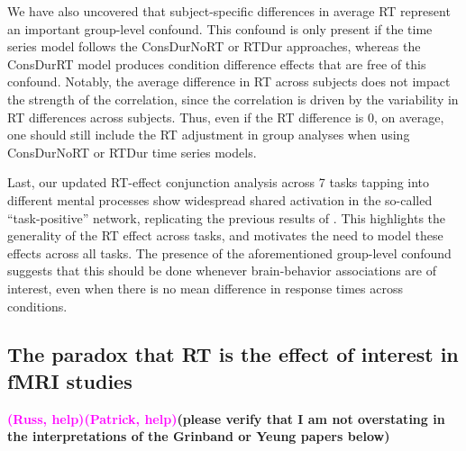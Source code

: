\documentclass[titlepage,12pt] {article}
\newcommand{\rh}{\textcolor{magenta}{\textbf{(Russ, help)}}}
\newcommand{\ph}{\textcolor{magenta}{\textbf{(Patrick, help)}}}
\begin{document}
We have also uncovered that subject-specific differences in average RT represent an important group-level confound.  This confound is only present if the time series model follows the ConsDurNoRT or RTDur approaches, whereas the ConsDurRT model produces condition difference effects that are free of this confound.  Notably, the average difference in RT across subjects does not impact the strength of the correlation, since the correlation is driven by the variability in RT differences across subjects.  Thus, even if the RT difference is 0, on average, one should still include the RT adjustment in group analyses when using ConsDurNoRT or RTDur time series models.


Last, our updated RT-effect conjunction analysis across 7 tasks tapping into different mental processes show widespread shared activation in the so-called ``task-positive'' network, replicating the previous results of \citet{yarkoni_bold_2009}. This highlights the generality of the RT effect across tasks, and motivates the need to model these effects across all tasks.  The presence of the aforementioned group-level confound suggests that this should be done whenever brain-behavior associations are of interest, even when there is no mean difference in response times across conditions.

\subsection*{The paradox that RT is the effect of interest in fMRI studies}
\rh\ph \textbf{(please verify that I am not overstating in the interpretations of the Grinband or Yeung papers below)}
\end{document}

